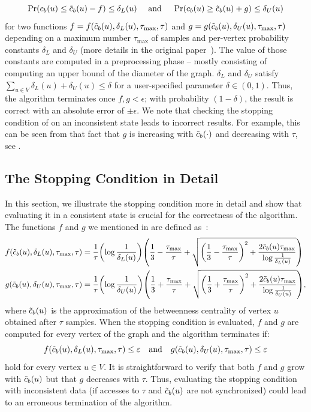 \begin{equation}
\label{eq:betw-apx:kadabra-invariants}
\Pr(c_b(u) \le \tilde{c}_b(u) - f) \le \delta_L(u)\quad \text{ and }\quad
\Pr(c_b(u) \ge \tilde{c}_b(u) + g) \le \delta_U(u)
\end{equation}
%
for two functions $f = f(\tilde{c}_b(u), \delta_L(u), \tau_{\max}, \tau)$
and $g = g(\tilde{c}_b(u), \delta_U(u), \tau_{\max}, \tau)$ depending on
a maximum number $\tau_{\max}$ of samples and per-vertex probability
constants $\delta_L$ and $\delta_U$ (more details in the original
paper~\cite{DBLP:conf/esa/BorassiN16}).
%
The value of those constants are computed in a preprocessing phase -- mostly
consisting of computing an upper bound of the diameter of the graph. $\delta_L$
and $\delta_U$ satisfy $\sum_{u \in V} \delta_L(u) + \delta_U(u) \le \delta$
for a user-specified parameter $\delta \in (0, 1)$. Thus, the algorithm
terminates once $f, g < \epsilon$; with probability $(1 - \delta)$, the result
is correct with an absolute error of $\pm\epsilon$.
%
We note that checking the stopping condition of \kadabra on an
inconsistent state leads to incorrect results. For example, this can
be seen from that fact that $g$ is increasing with $\tilde{c}_b(\cdot)$ and
decreasing with $\tau$, see .


\subsection{The Stopping Condition in Detail}
\label{sec:betw-apx:stopping-condition}
%
In this section, we illustrate the stopping condition more in detail and
show that evaluating it in a consistent state is crucial for the correctness
of the algorithm.
The functions $f$ and $g$ we mentioned in 
are defined as~\cite{DBLP:conf/esa/BorassiN16}:
%
\begin{align*}
    f(\bapx(u), \delta_{L}(u), \tau_{\max}, \tau) &=
  \frac{1}{\tau}\left(\log\frac{1}{\delta_{L}(u)}\right)
   \left(
  \frac{1}{3} - \frac{\tau_{\max}}{\tau}
  + \sqrt{\left(\frac{1}{3} - \frac{\tau_{\max}}{\tau} \right)^2 +
  \frac{2\bapx(u)\tau_{\max}}{\log\frac{1}{\delta_{L}(u)}}}
  \right)\\
  g(\bapx(u), \delta_{U}(u), \tau_{\max}, \tau) &=
  \frac{1}{\tau}\left(\log\frac{1}{\delta_{U}(u)}\right)
  \left(
  \frac{1}{3} + \frac{\tau_{\max}}{\tau}
  + \sqrt{\left(\frac{1}{3} + \frac{\tau_{\max}}{\tau} \right)^2 +
  \frac{2\bapx(u)\tau_{\max}}{\log\frac{1}{\delta_{U}(u)}}}
  \right),
\end{align*}
%
where $\tilde{c}_b(u)$ is the approximation of the betweenness centrality
of vertex $u$ obtained after $\tau$ samples.
When the stopping condition is evaluated, $f$ and $g$ are computed for every
vertex of the graph and the algorithm terminates if:
%
\[
f(\tilde{c}_b(u), \delta_{L}(u), \tau_{\max}, \tau) \le \varepsilon
\quad \text{and} \quad
g(\tilde{c}_b(u), \delta_{U}(u), \tau_{\max}, \tau) \le \varepsilon
\]
%
hold for every vertex $u \in V$.
It is straightforward to verify that both $f$ and $g$ grow with
$\tilde{c}_b(u)$ but that $g$ decreases with $\tau$. Thus, evaluating
the stopping condition with inconsistent data (\eg if accesses to
$\tau$ and $\tilde{c}_b(u)$ are not synchronized) could lead to an
erroneous termination of the algorithm.


